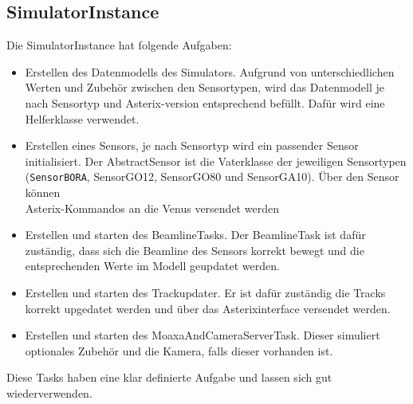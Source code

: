 \subsection{SimulatorInstance}
Die SimulatorInstance hat folgende Aufgaben:
\begin{itemize}
    \item Erstellen des Datenmodells des Simulators. Aufgrund von unterschiedlichen Werten und Zubehör zwischen den Sensortypen, wird das Datenmodell je nach Sensortyp und Asterix-version entsprechend befüllt. Dafür wird eine Helferklasse verwendet.
    \item Erstellen eines Sensors, je nach Sensortyp wird ein passender Sensor initialisiert. 
    Der AbstractSensor ist die Vaterklasse der jeweiligen Sensortypen (\texttt{SensorBORA}, SensorGO12, SensorGO80 und SensorGA10). Über den Sensor können \\Asterix-Kommandos an die Venus versendet werden
    \item Erstellen und starten des BeamlineTasks. Der BeamlineTask ist dafür zuständig, dass sich die Beamline des Sensors korrekt bewegt und die entsprechenden Werte im Modell geupdatet werden.
    \item Erstellen und starten des Trackupdater. Er ist dafür zuständig die Tracks korrekt upgedatet werden und über das Asterixinterface versendet werden.
    \item Erstellen und starten des MoaxaAndCameraServerTask. Dieser simuliert optionales Zubehör und die Kamera, falls dieser vorhanden ist.    
    
\end{itemize}

Diese Tasks haben eine klar definierte Aufgabe und lassen sich gut wiederverwenden.
